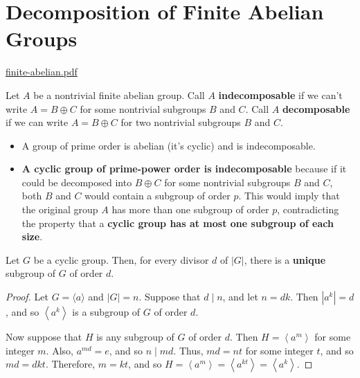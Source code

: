 \section{Decomposition of Finite Abelian Groups}

\href{https://kconrad.math.uconn.edu/blurbs/grouptheory/finite-abelian.pdf}{finite-abelian.pdf}

\begin{definition}[indecomposable]
Let $A$ be a nontrivial finite abelian group. Call $A$ \textbf{indecomposable} if we can't write $A=B \oplus C$ for some nontrivial subgroups $B$ and $C$. Call $A$ \textbf{decomposable} if we can write $A=B \oplus C$ for two nontrivial subgroups $B$ and $C$.
\end{definition}
\begin{itemize}
	\item A group of prime order is abelian (it's cyclic) and is indecomposable.
	\item \textbf{A cyclic group of prime-power order is indecomposable} because if it could be decomposed into $B\oplus C$ for some nontrivial subgroups $B$ and $C$, both $B$ and $C$ would contain a subgroup of order $p$. This would imply that the original group $A$ has more than one subgroup of order $p$, contradicting the property that a \textbf{cyclic group has at most one subgroup of each size}.
\end{itemize}

\begin{theorem}
Let $G$ be a cyclic group. Then, for every divisor $d$ of $|G|$, there is a \textbf{unique} subgroup of $G$ of order $d$.\label{602dc5}
\end{theorem}

\begin{proof}
Let $G=\langle a\rangle$ and $|G|=n$. Suppose that $d \mid n$, and let $n=d k$. Then $\left|a^k\right|=d$, and so $\left\langle a^k\right\rangle$ is a subgroup of $G$ of order $d$.

Now suppose that $H$ is any subgroup of $G$ of order $d$. Then $H=\left\langle a^m\right\rangle$ for some integer $m$. Also, $a^{m d}=e$, and so $n \mid m d$. Thus, $m d=n t$ for some integer $t$, and so $m d=d k t$. Therefore, $m=k t$, and so $H=\left\langle a^m\right\rangle=\left\langle a^{k t}\right\rangle=\left\langle a^k\right\rangle$.
\end{proof}

